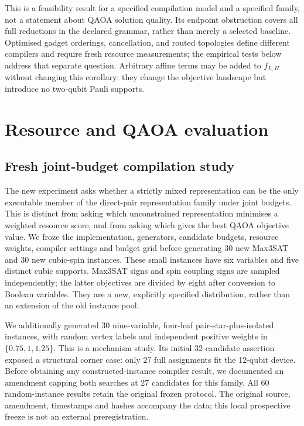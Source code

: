 \documentclass[a4paper,onecolumn,11pt,unpublished]{quantumarticle}
\theoremstyle{remark}
\begin{document}
This is a feasibility result for a specified compilation model and a
specified family, not a statement about QAOA solution quality. Its endpoint
obstruction covers all full reductions in the declared grammar, rather
than merely a selected baseline. Optimised gadget orderings, cancellation,
and routed topologies define different compilers and require fresh resource
measurements; the empirical tests below address that separate question.
Arbitrary affine terms may be added to $f_{L,H}$ without changing this
corollary: they change the objective landscape but introduce no two-qubit
Pauli supports.


\section{Resource and QAOA evaluation}
\label{sec:new-evaluation}
\subsection{Fresh joint-budget compilation study}
\label{sec:fresh-compiled}

The new experiment asks whether a strictly mixed representation can be the
only executable member of the direct-pair representation family under joint
budgets. This is distinct from asking which unconstrained representation
minimises a weighted resource score, and from asking which gives the best
QAOA objective value. We froze the implementation, generators, candidate
budgets, resource weights, compiler settings and budget grid before generating
30 new Max3SAT and 30 new cubic-spin instances. These small instances have
six variables and five distinct cubic supports. Max3SAT signs and spin
coupling signs are sampled independently; the latter objectives are divided
by eight after conversion to Boolean variables. They are a new, explicitly
specified distribution, rather than an extension of the old instance pool.

We additionally generated 30 nine-variable, four-leaf pair-star-plus-isolated
instances, with random vertex labels and independent positive weights in
$\{0.75,1,1.25\}$. This is a mechanism study. Its initial 32-candidate
assertion exposed a structural corner case: only 27 full assignments fit
the 12-qubit device. Before obtaining any constructed-instance compiler
result, we documented an amendment capping both searches at 27 candidates
for this family. All 60 random-instance results retain the original frozen
protocol. The original source, amendment, timestamps and hashes accompany
the data; this local prospective freeze is not an external preregistration.
\end{document}
